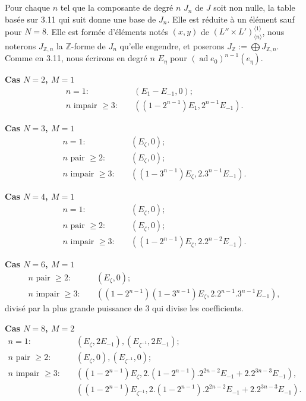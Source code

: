 \documentclass[11pt,a4paper]{article}
\theoremstyle{plain}
\theoremstyle{definition}
\DeclareMathOperator{\ad}{ad}
\newcommand{\Z}{\mathbb{Z}}
\begin{document}
\subsection{}
Pour chaque $n$ tel que la composante de degr\'e $n$ $J_n$ de $J$ soit non nulle, la table bas\'ee sur 3.11 qui suit donne une base de $J_n$. Elle est r\'eduite \`a un \'el\'ement sauf pour $N=8$. Elle est form\'ee d'\'el\'ements not\'es $(x,y)$ de $(L'' \times L')^{\langle 1 \rangle}_{\langle n \rangle}$, nous noterons $J_{\Z,n}$ la $\Z$-forme de $J_n$ qu'elle engendre, et poserons $J_\Z := \bigoplus J_{\Z,n}$. Comme en 3.11, nous \'ecrirons en degr\'e $n$ $E_\eta$ pour $(\ad e_0)^{n-1}(e_\eta)$.

\medskip
\noindent\textbf{Cas $N=2$, $M=1$}
\begin{align*}
n=1: &\quad (E_1 - E_{-1}, 0); \\
n \text{ impair } \geq 3: &\quad ((1-2^{n-1})E_1, 2^{n-1}E_{-1}).
\end{align*}

\medskip
\noindent\textbf{Cas $N=3$, $M=1$}
\begin{align*}
n=1: &\quad (E_\zeta, 0); \\
n \text{ pair } \geq 2: &\quad (E_\zeta, 0); \\
n \text{ impair } \geq 3: &\quad ((1-3^{n-1})E_\zeta, 2.3^{n-1}E_{-1}).
\end{align*}

\medskip
\noindent\textbf{Cas $N=4$, $M=1$}
\begin{align*}
n=1: &\quad (E_\zeta, 0); \\
n \text{ pair } \geq 2: &\quad (E_\zeta, 0); \\
n \text{ impair } \geq 3: &\quad ((1-2^{n-1})E_\zeta, 2.2^{n-2}E_{-1}).
\end{align*}

\medskip
\noindent\textbf{Cas $N=6$, $M=1$}
\begin{align*}
n \text{ pair } \geq 2: &\quad (E_\zeta, 0); \\
n \text{ impair } \geq 3: &\quad ((1-2^{n-1})(1-3^{n-1})E_\zeta, 2.2^{n-1}.3^{n-1}E_{-1}),
\end{align*}
divis\'e par la plus grande puissance de $3$ qui divise les coefficients.

\medskip
\noindent\textbf{Cas $N=8$, $M=2$}
\begin{align*}
n=1: &\quad (E_\zeta, 2E_{-1}), (E_{\zeta^{-1}}, 2E_{-1}); \\
n \text{ pair } \geq 2: &\quad (E_\zeta, 0), (E_{\zeta^{-1}}, 0); \\
n \text{ impair } \geq 3: &\quad ((1-2^{n-1})E_\zeta, 2.(1-2^{n-1}).2^{2n-2}E_{-1} + 2.2^{3n-3}E_{-1}), \\
&\quad ((1-2^{n-1})E_{\zeta^{-1}}, 2.(1-2^{n-1}).2^{2n-2}E_{-1} + 2.2^{3n-3}E_{-1}).
\end{align*}
\end{document}
